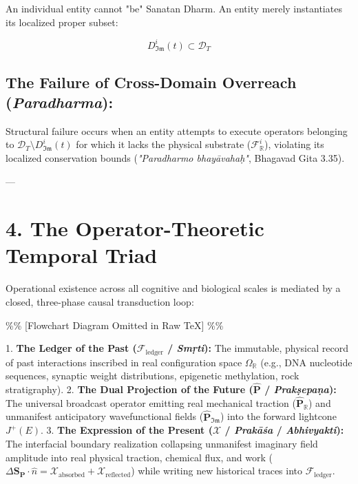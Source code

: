 \documentclass[11pt,a4paper]{article}
\theoremstyle{definition}
\theoremstyle{remark}
\begin{document}
An individual entity cannot "be" Sanatan Dharm. An entity merely instantiates its localized proper subset:

\begin{equation}
\boxed{D_{\mathfrak{Im}}^i(t) \subset \mathcal{D}_T}
\end{equation}


\subsection{The Failure of Cross-Domain Overreach (\textit{Paradharma}):}
Structural failure occurs when an entity attempts to execute operators belonging to $\mathcal{D}_T \setminus D_{\mathfrak{Im}}^i(t)$ for which it lacks the physical substrate ($\mathcal{F}_{\mathbb{R}}^i$), violating its localized conservation bounds (\textit{"Paradharmo bhayāvahaḥ"}, Bhagavad Gita 3.35).

---

\section{4. The Operator-Theoretic Temporal Triad}

Operational existence across all cognitive and biological scales is mediated by a closed, three-phase causal transduction loop:

\%\% [Flowchart Diagram Omitted in Raw TeX] \%\%

1. \textbf{The Ledger of the Past ($\mathcal{F}_{\text{ledger}}$ / \textit{Smṛti}):}  
   The immutable, physical record of past interactions inscribed in real configuration space $\Omega_{\mathbb{R}}$ (e.g., DNA nucleotide sequences, synaptic weight distributions, epigenetic methylation, rock stratigraphy).
2. \textbf{The Dual Projection of the Future ($\hat{\mathbf{P}}$ / \textit{Prakṣepaṇa}):}  
   The universal broadcast operator emitting real mechanical traction ($\hat{\mathbf{P}}_{\mathbb{R}}$) and unmanifest anticipatory wavefunctional fields ($\hat{\mathbf{P}}_{\mathfrak{Im}}$) into the forward lightcone $J^+(E)$.
3. \textbf{The Expression of the Present ($\boldsymbol{\mathcal{X}}$ / \textit{Prakāśa} / \textit{Abhivyakti}):}  
   The interfacial boundary realization collapsing unmanifest imaginary field amplitude into real physical traction, chemical flux, and work ($\Delta \mathbf{S}_{\mathbf{P}} \cdot \hat{n} = \mathcal{X}_{\text{absorbed}} + \mathcal{X}_{\text{reflected}}$) while writing new historical traces into $\mathcal{F}_{\text{ledger}}$.
\end{document}
